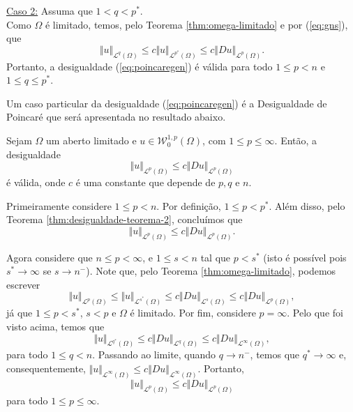 \documentclass[a4paper, 11pt]{book}
\theoremstyle{definition}
\newcommand{\cL}{\mathcal{L}}
\newcommand{\cW}{\mathcal{W}}
\begin{document}
\begin{prf}
    \underline{Caso 2:} Assuma que $1 < q < p^*$.\\
    Como $\Omega$ é limitado, temos, pelo Teorema \ref{thm:omega-limitado} e por (\ref{eq:gns}), que
    \[
        \Vert u \Vert_{\cL^q(\Omega)} \leqslant c\Vert u \Vert_{\cL^{p^*}(\Omega)} \leqslant c \Vert Du \Vert_{\cL^p(\Omega)}.
    \]
    Portanto, a desigualdade (\ref{eq:poincaregen}) é válida para todo $1 \leqslant p < n$ e $1 \leqslant q \leqslant p^*$.
\end{prf}

Um caso particular da desigualdade (\ref{eq:poincaregen}) é a Desigualdade de Poincaré que será apresentada no resultado abaixo.

\begin{cbox} \label{cl:poincare}
   Sejam $\Omega$ um aberto limitado e $u \in \cW^{1,p}_0(\Omega)$, com $1 \leqslant p \leqslant \infty$. Então, a desigualdade
   \[
        \Vert u \Vert_{\cL^p(\Omega)} \leqslant c\Vert Du \Vert_{\cL^p(\Omega)}
   \]
   é válida,
   onde $c$ é uma constante que depende de $p, q$ e $n$.
\end{cbox}
\begin{prf}
    Primeiramente considere $1 \leqslant p < n$.
    Por definição, $1 \leqslant p < p^*$. Além disso, pelo Teorema \ref{thm:desigualdade-teorema-2}, concluímos que
    \[
        \Vert u \Vert_{\cL^p(\Omega)} \leqslant c \Vert Du \Vert_{\cL^p(\Omega)}.
    \]

    Agora considere que $n \leqslant p < \infty$, e $1 \leqslant s < n$ tal que $p < s^*$ (isto é possível pois $s^* \to \infty$ se $s \to n^-$).
    Note que, pelo Teorema \ref{thm:omega-limitado}, podemos escrever
    \[
        \Vert u \Vert_{\cL^p(\Omega)} \leqslant \Vert u \Vert_{\cL^{s^*}(\Omega)} \leqslant c \Vert Du \Vert_{\cL^s(\Omega)} \leqslant c \Vert Du \Vert_{\cL^p(\Omega)},
    \]
    já que $1 \leqslant p < s^*$, $s < p$ e $\Omega$ é limitado.
    Por fim, considere $p = \infty$.
    Pelo que foi visto acima, temos que
    \[
        \Vert u \Vert_{\cL^{q^*}(\Omega)} \leqslant c \Vert Du \Vert_{\cL^{q}(\Omega)} \leqslant c \Vert Du \Vert_{\cL^\infty(\Omega)},
    \]
    para todo $1 \leqslant q < n$.
    Passando ao limite, quando $q \to n^-$, temos que $q^* \to \infty$ e, consequentemente, $\Vert u \Vert_{\cL^\infty(\Omega)} \leqslant c \Vert Du \Vert_{\cL^\infty(\Omega)}$.
    Portanto,
    \[
        \Vert u \Vert_{\cL^p(\Omega)} \leqslant c\Vert Du \Vert_{\cL^p(\Omega)}
    \]
    para todo $1 \leqslant p \leqslant \infty$.
\end{prf}
\end{document}
